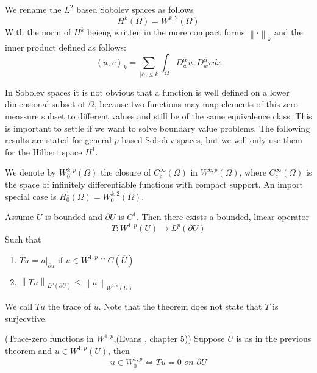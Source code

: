 \documentclass[../Main/main.tex]{subfiles}
\begin{document}
	\begin{definition}
		We rename the $L^2$ based Sobolev spaces as follows 
		\begin{equation*}
			H^k(\Omega) = W^{k,2}(\Omega)
		\end{equation*}
		With the norm of $H^k$ beieng written in the more compact forms $\left \| \cdot \right \|_k$ and the inner product defined as follows:
		\begin{equation*}
			\left \langle u,v \right \rangle_k = \sum_{|\overline{\alpha}| \leq k} \int_{\Omega}D_w^{\overline{\alpha}}u,D_w^{\overline{\alpha}}v dx
		\end{equation*}
	\end{definition}

	In Sobolev spaces it is not obvious that a function is well defined on a lower dimensional subset of $\Omega$, because two functions may map elements of this zero meassure subset to different values and still be of the same equivalence class. This is important to settle if we want to solve boundary value problems. The following results are stated for general $p$ based Sobolev spaces, but we will only use them for the Hilbert space $H^1$.
	\begin{definition}
		We denote by $W_0^{k,p}(\Omega)$ the closure of $C_c^{\infty}(\Omega)$ in $W^{k,p}(\Omega)$, where $C_c^{\infty}(\Omega)$ is the space of infinitely differentiable functions with compact support. An import special case is $H_0^1(\Omega)=W_0^{k,2}(\Omega)$.
	\end{definition}
	\begin{theorem}
		Assume $U$ is bounded and $\partial U$ is $C^1$. Then there exists a bounded, linear operator
		\begin{equation*}
			T: W^{1,p}(U) \rightarrow L^p(\partial U)
		\end{equation*}
		Such that
		\begin{enumerate}
			\item $ Tu = u|_{\partial u} $ if $u\in W^{1,p}\cap C(\overline{U})$
			\item $\left \|Tu\right\|_{L^p(\partial U)}\leq \left \| u \right \|_{W^{1,p}(U)}$
		\end{enumerate}
	\end{theorem}
	We call $Tu$ the trace of $u$. Note that the theorem does not state that $T$ is surjecvtive.
	\begin{theorem}(Trace-zero functions in $W^{1,p}$,(Evans \cite{evans10}, chapter 5))
		Suppose $U$ is as in the previous theorem and $u\in W^{1,p}(U)$, then
		\begin{equation}
			u\in W^{1,p}_0 \Leftrightarrow  Tu=0 \textit{ on }\partial U
		\end{equation}
	\end{theorem}
	
\end{document}

